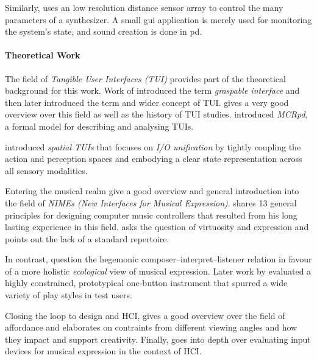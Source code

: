 \documentclass[10pt,a4paper]{scrartcl}
\begin{document}
Similarly, \cite{Miyama2010} uses an low resolution distance sensor array to control the many parameters of a synthesizer. A small gui application is merely used for monitoring the system's state, and sound creation is done in pd.


\paragraph{Theoretical Work}
The field of \emph{Tangible User Interfaces (TUI)} provides part of the theoretical background for this work. Work of \cite{Fitzmaurice1995} introduced the term \emph{graspable interface} and then later \cite{Ishii1997} introduced the term and wider concept of TUI. \cite{Shaer2009} gives a very good overview over this field as well as the history of TUI studies. \cite{Ullmer2000} introduced \emph{MCRpd}, a formal model for describing and analysing TUIs.

\cite{Sharlin2004} introduced \emph{spatial TUIs} that focuses on \emph{I/O unification} by tightly coupling the action and perception spaces and embodying a clear state representation across all sensory modalities.


Entering the musical realm \cite{Fels2011} give a good overview and general introduction into the field of \emph{NIMEs (New Interfaces for Musical Expression)}. \cite{Cook2001} shares 13 general principles for designing computer music controllers that resulted from his long lasting experience in this field. \cite{Dobrian2006} asks the question of virtuosity and expression and points out the lack of a standard repertoire.

In contrast, \cite{Gurevich2007} question the hegemonic composer--interpret--listener relation in favour of a more holistic \emph{ecological} view of musical expression. Later work by \cite{Gurevich2010} evaluated a highly constrained, prototypical one-button instrument that spurred a wide variety of play styles in test users.

Closing the loop to design and HCI, \cite{Magnusson2010} gives a good overview over the field of affordance and elaborates on contraints from different viewing angles and how they impact and support creativity. Finally, \cite{Wanderley2002} goes into depth over evaluating input devices for musical expression in the context of HCI. 






\end{document}
